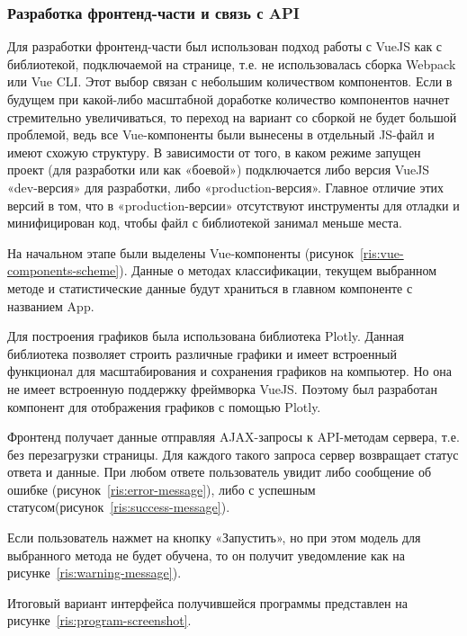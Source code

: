 \subsubsection{Разработка фронтенд-части и связь с API}
Для разработки фронтенд-части был использован подход работы с VueJS как с библиотекой, подключаемой на странице, т.е. не использовалась сборка Webpack или Vue CLI. Этот выбор связан с небольшим количеством компонентов. Если в будущем при какой-либо масштабной доработке количество компонентов начнет стремительно увеличиваться, то переход на вариант со сборкой не будет большой проблемой, ведь все Vue-компоненты были вынесены в отдельный JS-файл и имеют схожую структуру. В зависимости от того, в каком режиме запущен проект (для разработки или как «боевой») подключается либо версия VueJS «dev-версия» для разработки, либо «production-версия». Главное отличие этих версий в том, что в «production-версии» отсутствуют инструменты для отладки и минифицирован код, чтобы файл с библиотекой занимал меньше места.
\par
На начальном этапе были выделены Vue-компоненты (рисунок~\ref{ris:vue-components-scheme}). Данные о методах классификации, текущем выбранном методе и статистические данные будут храниться в главном компоненте с названием App.
\par
Для построения графиков была использована библиотека Plotly. Данная библиотека позволяет строить различные графики и имеет встроенный функционал для масштабирования и сохранения графиков на компьютер. Но она не имеет встроенную поддержку фреймворка VueJS. Поэтому был разработан компонент для отображения графиков с помощью Plotly.
\par
Фронтенд получает данные отправляя AJAX-запросы к API-методам сервера, т.е. без перезагрузки страницы. Для каждого такого запроса сервер возвращает статус ответа и данные. При любом ответе пользователь увидит либо сообщение об ошибке (рисунок~\ref{ris:error-message}), либо с успешным статусом(рисунок~\ref{ris:success-message}). 
\par
Если пользователь нажмет на кнопку «Запустить», но при этом модель для выбранного метода не будет обучена, то он получит уведомление как на рисунке~\ref{ris:warning-message}).
\par
Итоговый вариант интерфейса получившейся программы представлен на рисунке~\ref{ris:program-screenshot}.

